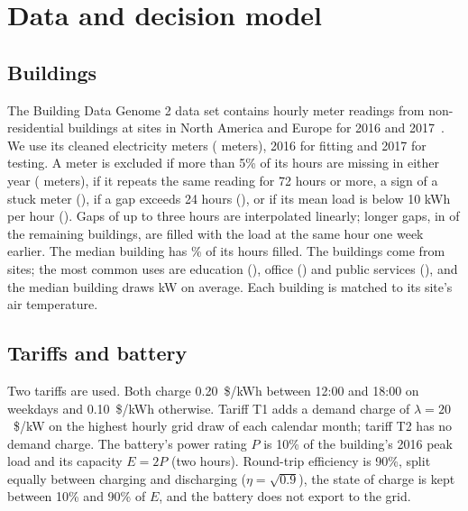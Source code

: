 \section{Data and decision model}\label{sec:model}

\subsection{Buildings}
The Building Data Genome 2 data set contains hourly meter readings from  non-residential buildings at  sites in North America and Europe for 2016 and 2017~\cite{miller2020bdg2}. We use its cleaned electricity meters ( meters), 2016 for fitting and 2017 for testing. A meter is excluded if more than 5\% of its hours are missing in either year ( meters), if it repeats the same reading for 72 hours or more, a sign of a stuck meter (), if a gap exceeds 24 hours (), or if its mean load is below 10 kWh per hour (). Gaps of up to three hours are interpolated linearly; longer gaps, in  of the  remaining buildings, are filled with the load at the same hour one week earlier. The median building has \% of its hours filled. The  buildings come from  sites; the most common uses are education (), office () and public services (), and the median building draws  kW on average. Each building is matched to its site's air temperature.

\subsection{Tariffs and battery}
Two tariffs are used. Both charge 0.20~\$/kWh between 12:00 and 18:00 on weekdays and 0.10~\$/kWh otherwise. Tariff T1 adds a demand charge of $\lambda=20$~\$/kW on the highest hourly grid draw of each calendar month; tariff T2 has no demand charge. The battery's power rating $P$ is 10\% of the building's 2016 peak load and its capacity $E=2P$ (two hours). Round-trip efficiency is 90\%, split equally between charging and discharging ($\eta=\sqrt{0.9}$), the state of charge is kept between 10\% and 90\% of $E$, and the battery does not export to the grid.

